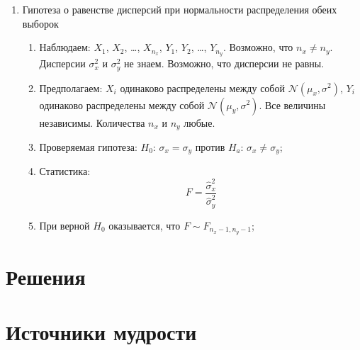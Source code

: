 \documentclass[12pt, a4paper]{article}
\newcommand{\cN}{\mathcal{N}}
\newcounter{problem}[section]
\begin{document}
\begin{enumerate}[resume]
\begin{enumerate}
     \item Статистика:
	\[
	  t = \frac{\bar D - \mu_d}{se(\bar D)} =
	  \frac{\bar X - \bar Y - \mu_d}{\sqrt{\frac{\hat \sigma^2_d}{n}}},
      \]
      где
      \[
	\hat \sigma^2_d = \frac{\sum (D_i - \bar D)^2 }{n - 1} = \frac{\sum (X_i - Y_i - (\bar X - \bar Y))^2 }{n - 1}
      \]

    \item При верной $H_0$ оказывается, что $t \sim t_{n-1}$;
\end{enumerate}


  \item Гипотеза о равенстве дисперсий при нормальности распределения обеих выборок
    \begin{enumerate}
      \item Наблюдаем: $X_1$, $X_2$, \ldots, $X_{n_x}$, $Y_1$, $Y_2$, \ldots, $Y_{n_y}$.
	Возможно, что $n_x \neq n_y$. Дисперсии $\sigma^2_x$ и $\sigma^2_y$ не знаем. Возможно, что дисперсии не равны.
      \item Предполагаем: $X_i$ одинаково распределены между собой $\cN(\mu_x, \sigma^2)$,
	$Y_i$ одинаково распределены между собой $\cN(\mu_y, \sigma^2)$.
	Все величины независимы. Количества $n_x$ и $n_y$ любые.


      \item Проверяемая гипотеза: $H_0$: $\sigma_x = \sigma_y$ против $H_a$: $\sigma_x \neq \sigma_y$;

     \item Статистика:
	\[
	F = \frac{\hat \sigma^2_x}{\hat \sigma^2_y}
      \]
     \item При верной $H_0$ оказывается, что $F \sim F_{n_x-1, n_y - 1}$;
\end{enumerate}


\end{enumerate}








\renewenvironment{solution}[1]{%
         \vskip .5cm plus 2cm minus 0.1cm%
         {\bfseries \hyperlink{problem:#1}{#1.}}%
}%
{%
}%

\section{Решения}



\printindex


\section{Источники мудрости}

\nocite{buzun2015stochastic}

\printbibliography[heading=none]
\end{document}
